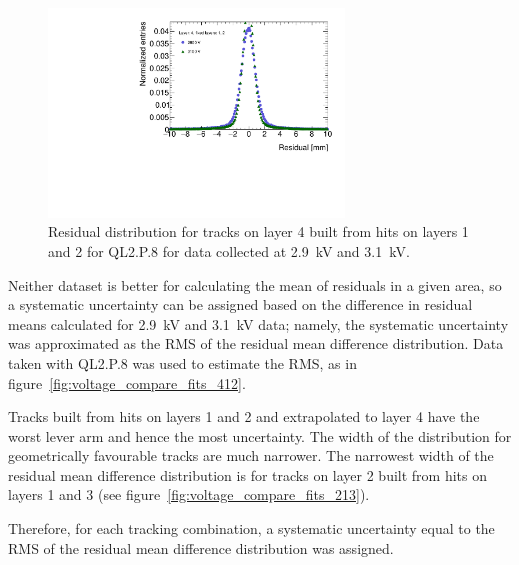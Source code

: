 \begin{figure}
    \centering
    \includegraphics[width = 0.7\textwidth]{figures/figure_residual_distributions_blue_QL2P08_2900V_2021-05-21_green_QL2P08_3100V_2021-05-21_layer4_fixedlayers12.pdf}
    \caption{Residual distribution for tracks on layer 4 built from hits on layers 1 and 2 for QL2.P.8 for data collected at 2.9~kV and 3.1~kV.}
    \label{fig:res_dist_2900V_3100V_412}
\end{figure}

Neither dataset is better for calculating the mean of residuals in a given area, so a systematic uncertainty can be assigned based on the difference in residual means calculated for 2.9~kV and 3.1~kV data; namely, the systematic uncertainty was approximated as the RMS of the residual mean difference distribution. Data taken with QL2.P.8 was used to estimate the RMS, as in figure~\ref{fig:voltage_compare_fits_412}.

Tracks built from hits on layers 1 and 2 and extrapolated to layer 4 have the worst lever arm and hence the most uncertainty. The width of the distribution for geometrically favourable tracks are much narrower. The narrowest width of the residual mean difference distribution is for tracks on layer 2 built from hits on layers 1 and 3 (see figure~\ref{fig:voltage_compare_fits_213}). 

Therefore, for each tracking combination, a systematic uncertainty equal to the RMS of the residual mean difference distribution was assigned.

